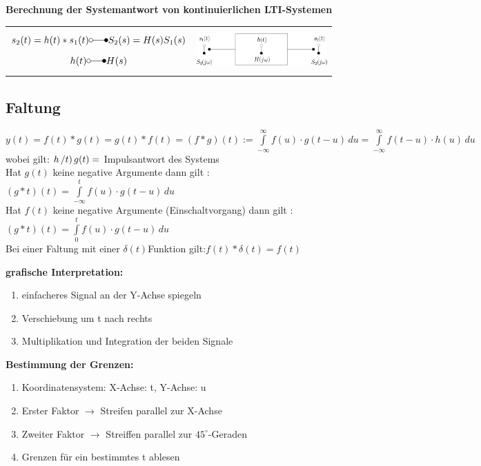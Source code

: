 		\textbf{Berechnung der Systemantwort von kontinuierlichen LTI-Systemen}\\
		\begin{tabular}{ll}
			\parbox{8cm}{
			$$s_2(t) = h(t) * s_1(t) \laplace S_2(s) = H(s) S_1(s)$$
			$$h(t) \laplace H(s)$$}
			& \parbox{4cm}{
			\includegraphics[width=5cm]{./bilder/utf-theorie.png}}\\
		\end{tabular}	
		
	\subsection{Faltung}
	$y(t) = f(t)\ast g(t) = g(t) \ast f(t) = (f \ast g)(t) :=
	\int\limits_{-\infty}^\infty f(u) \cdot g(t-u)\,du =
	\int\limits_{-\infty}^\infty f(t-u) \cdot h(u)\,du $ \\
	wobei gilt: $h\left/t\right) g(t) = $ Impulsantwort des Systems \\
	Hat $g\left(t\right)$ keine negative Argumente dann gilt :
	$\left(g \ast t \right)\left(t\right)=\int\limits_{-\infty}^t f(u) \cdot
	g(t-u)\,du$\\
	Hat $f\left(t\right)$ keine negative Argumente (Einschaltvorgang) dann gilt :
	$\left(g \ast t \right)\left(t\right)=\int\limits_{0}^t f(u) \cdot
	g(t-u)\,du$\\
	Bei einer Faltung mit einer $\delta\left(t\right)$Funktion
	gilt:$f\left(t\right) \ast \delta\left(t\right) = f\left(t\right)$\\
	
	\newpage
	
	\begin{multicols}{2}
		\textbf{grafische Interpretation:}
		\begin{enumerate}
  			\item einfacheres Signal an der Y-Achse spiegeln
  			\item Verschiebung um t nach rechts
  			\item Multiplikation und Integration der beiden Signale
		\end{enumerate}
		\columnbreak
		\textbf{Bestimmung der Grenzen:}
		\begin{enumerate}
		  \item Koordinatensystem: X-Achse: t, Y-Achse: u
		  \item Erster Faktor $\rightarrow$ Streifen parallel zur X-Achse
		  \item Zweiter Faktor $\rightarrow$ Streiffen parallel zur $45^{\circ}$-Geraden
		  \item Grenzen für ein bestimmtes t ablesen
		\end{enumerate}
	\end{multicols}	